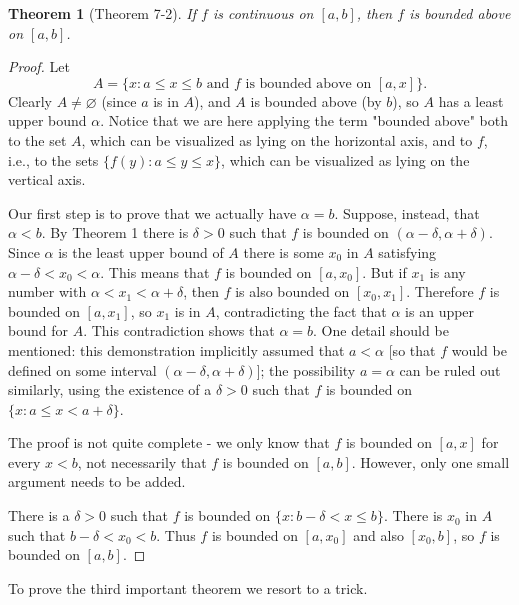 \documentclass{article}
\newtheorem*{theorem*}{Theorem}
\begin{document}
\begin{theorem*}[Theorem 7-2]
  If $f$ is continuous on $[a, b]$, then $f$ is bounded above on $[a, b]$.
\end{theorem*}
\begin{proof}
  Let \[
    A = \{x: a \leq x \leq b \text{ and } f \text{ is bounded above on } [a,
      x]\}.
  \] Clearly $A \neq \varnothing$ (since $a$ is in $A$), and $A$ is bounded
  above (by $b$), so $A$ has a least upper bound $\alpha$. Notice that we are
  here applying the term "bounded above" both to the set $A$, which can be
  visualized as lying on the horizontal axis, and to $f$, i.e., to the sets
  $\{f(y): a \leq y \leq x\}$, which can be visualized as lying on the vertical
  axis.

  Our first step is to prove that we actually have $\alpha = b$. Suppose,
  instead, that $\alpha < b$. By Theorem 1 there is $\delta > 0$ such that $f$
  is bounded on $(\alpha - \delta, \alpha + \delta)$. Since $\alpha$ is the
  least upper bound of $A$ there is some $x_0$ in $A$ satisfying $\alpha -
  \delta < x_0 < \alpha$. This means that $f$ is bounded on $[a, x_0]$. But if
  $x_1$ is any number with $\alpha < x_1 < \alpha + \delta$, then $f$ is also
  bounded on $[x_0, x_1]$. Therefore $f$ is bounded on $[a, x_1]$, so $x_1$ is
  in $A$, contradicting the fact that $\alpha$ is an upper bound for $A$. This
  contradiction shows that $\alpha = b$. One detail should be mentioned: this
  demonstration implicitly assumed that $a < \alpha$ [so that $f$ would be
  defined on some interval $(\alpha - \delta, \alpha + \delta)$]; the
  possibility $a = \alpha$ can be ruled out similarly, using the existence of a
  $\delta > 0$ such that $f$ is bounded on $\{x: a \leq x < a + \delta\}$.

  The proof is not quite complete - we only know that $f$ is bounded on $[a,
  x]$ for every $x < b$, not necessarily that $f$ is bounded on $[a, b]$.
  However, only one small argument needs to be added.

  There is a $\delta > 0$ such that $f$ is bounded on $\{x: b - \delta < x \leq
  b\}$. There is $x_0$ in $A$ such that $b - \delta < x_0 < b$. Thus $f$ is
  bounded on $[a, x_0]$ and also $[x_0, b]$, so $f$ is bounded on $[a, b]$.
\end{proof}

To prove the third important theorem we resort to a trick.
\end{document}
